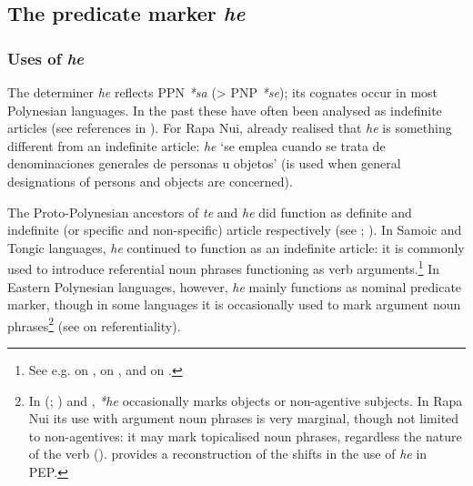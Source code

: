 \subsection{The predicate marker \textit{he}}\label{sec:5.3.4}
\subsubsection[Uses of he]{Uses of \textit{he}}\label{sec:5.3.4.1}

The determiner \textit{he} reflects PPN \textit{*sa} ({\textgreater} PNP \textit{*se}); its cognates occur in most Polynesian languages. In the past these have often been analysed as indefinite articles (see references in \citealt[230]{Polinsky1992}). For Rapa Nui, \citet[18]{Englert1978} already realised that \textit{he} is something different from an indefinite article: \textit{he} ‘se emplea cuando se trata de denominaciones generales de personas u objetos’ (is used when general designations of persons and objects are concerned). 

The Proto-Polynesian ancestors of \textit{te} and \textit{he} did function as definite and indefinite (or specific and non-specific) article respectively (see \citealt[47–50]{Clark1976}; \citealt[411]{Hamp1977}). In Samoic and Tongic languages, \textit{he} continued to function as an indefinite article: it is  commonly used to introduce referential noun phrases functioning as verb arguments.\footnote{\label{fn:255}See e.g. \citet[261–264]{MoselHovdhaugen1992} on , \citet[365]{Besnier2000} on , and \citet[22]{AndersonOtsuka2006} on .} In Eastern Polynesian languages, however, \textit{he} mainly functions as nominal predicate marker, though in some languages it is occasionally used to mark argument noun phrases\footnote{\label{fn:256}In  (\citealt{Polinsky1992}; \citealt{ChungMason1995}) and  \citep{Cook1999}, \textit{*he} occasionally marks objects or non-agentive subjects. In Rapa Nui its use with argument noun phrases is very marginal, though not limited to non-agentives: it may mark topicalised noun phrases, regardless the nature of the verb (). \citet{Clark1997} provides a reconstruction of the shifts in the use of \textit{he} in PEP.} (see  on referentiality). 

